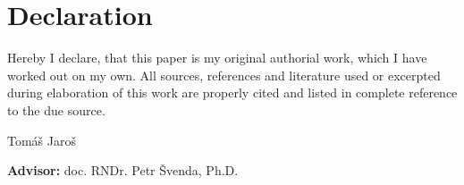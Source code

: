 \chapter*{Declaration}

\noindent
Hereby I declare, that this paper is my original authorial work, which I
have worked out on my own. All sources, references and literature used or
excerpted during elaboration of this work are properly cited and listed in
complete reference to the due source.

\vspace{1cm}
\begin{flushright}
    Tomáš Jaroš
\end{flushright}
\vfill
\textbf{Advisor:} doc. RNDr. Petr Švenda, Ph.D.

